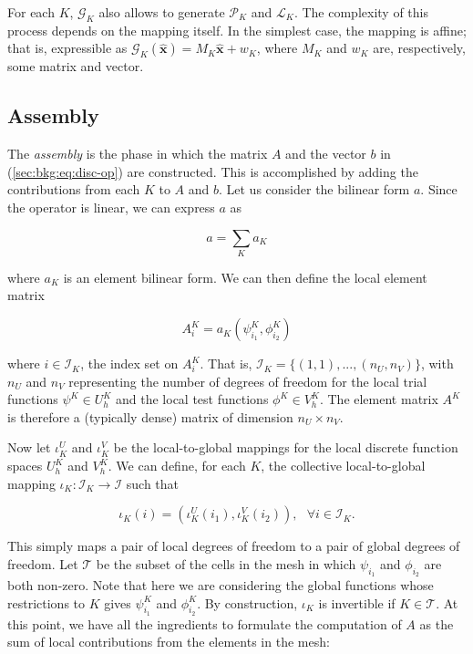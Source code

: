 For each $K$, $\mathcal{G}_K$ also allows to generate $\mathcal{P}_K$ and $\mathcal{L}_K$.  The complexity of this process depends on the mapping itself. In the simplest case, the mapping is affine; that is, expressible as $\mathcal{G}_K(\hat{\boldsymbol{x}}) = M_K \hat{\boldsymbol{x}} + w_K$, where $M_K$ and $w_K$ are, respectively, some matrix and vector.


\subsection{Assembly}
\label{sec:bkg:assembly}
The {\em assembly} is the phase in which the matrix $A$ and the vector $b$ in (\ref{sec:bkg:eq:disc-op}) are constructed. This is accomplished by adding the contributions from each $K$ to $A$ and $b$. Let us consider the bilinear form $a$. Since the operator is linear, we can express $a$ as

\begin{equation}
a = \sum_{K} a_K
\end{equation}

where $a_K$ is an element bilinear form. We can then define the local element matrix

\begin{equation}
A_i^K = a_K (\psi_{i_1}^K, \phi_{i_2}^K)
\end{equation}

where $i \in \mathcal{I}_K$, the index set on $A_i^K$. That is, $\mathcal{I}_K = \lbrace (1,1), ..., (n_U, n_V) \rbrace$, with $n_U$ and $n_V$ representing the number of degrees of freedom for the local trial functions $\psi^K \in U_h^K$ and the local test functions $\phi^K \in V_h^K$. The element matrix $A^K$ is therefore a (typically dense) matrix of dimension $n_U \times n_V$.

Now let $\iota_K^U$ and $\iota_K^V$ be the local-to-global mappings for the local discrete function spaces $U_h^K$ and $V_h^K$. We can define, for each $K$, the collective local-to-global mapping $\iota_K : \mathcal{I}_K \rightarrow \mathcal{I}$ such that

\begin{equation}
\iota_K (i) = (\iota_K^U(i_1), \iota_K^V(i_2)),\ \ \ \forall i \in \mathcal{I}_K.
\end{equation}

This simply maps a pair of local degrees of freedom to a pair of global degrees of freedom. Let $\mathcal{T}$ be the subset of the cells in the mesh in which $\psi_{i_1}$ and $\phi_{i_2}$ are both non-zero. Note that here we are considering the global functions whose restrictions to $K$ gives $\psi_{i_1}^K$ and $\phi_{i_2}^K$. By construction, $\iota_K$ is invertible if $K \in \mathcal{T}$. At this point, we have all the ingredients to formulate the computation of $A$ as the sum of local contributions from the elements in the mesh:

